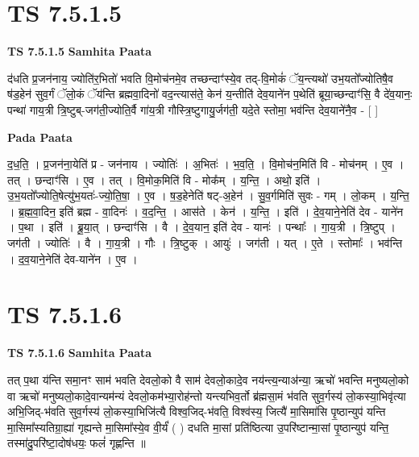 \documentclass[17pt]{extarticle}
\begin{document}
\section*{ TS 7.5.1.5 }

\textbf{TS 7.5.1.5 } \newline
\textbf{Samhita Paata} \newline

द॑धति प्र॒जन॑नाय॒ ज्योति॑र॒भितो॑ भवति वि॒मोच॑नमे॒व तच्छन्दाꣳ॑स्ये॒व तद्-वि॒मोकं॑ ॅय॒न्त्यथो॑ उभ॒यतो᳚ज्योतिषै॒व ष॑ड॒हेन॑ सुव॒र्गं ॅलो॒कं ॅय॑न्ति ब्रह्मवा॒दिनो॑ वद॒न्त्यास॑ते॒ केन॑ य॒न्तीति॑ देव॒याने॑न प॒थेति॑ ब्रूया॒च्छन्दाꣳ॑सि॒ वै दे॑व॒यानः॒ पन्था॑ गाय॒त्री त्रि॒ष्टुब्-जग॑ती॒ज्योति॒र्वै गा॑य॒त्री गौस्त्रि॒ष्टुगायु॒र्जग॑ती॒ यदे॒ते स्तोमा॒ भव॑न्ति देव॒याने॑नै॒व - [  ] \newline

\textbf{Pada Paata} \newline

द॒ध॒ति॒ । प्र॒जन॑ना॒येति॑ प्र - जन॑नाय । ज्योतिः॑ । अ॒भितः॑ । भ॒व॒ति॒ । वि॒मोच॑न॒मिति॑ वि - मोच॑नम् । ए॒व । तत् । छन्दाꣳ॑सि । ए॒व । तत् । वि॒मोक॒मिति॑ वि - मोक᳚म् । य॒न्ति॒ । अथो॒ इति॑ । उ॒भ॒यतो᳚ज्योति॒षेत्यु॑भ॒यतः॑-ज्यो॒ति॒षा॒ । ए॒व । ष॒ड॒हेनेति॑ षट्-अ॒हेन॑ । सु॒व॒र्गमिति॑ सुवः - गम् । लो॒कम् । य॒न्ति॒ । ब्र॒ह्म॒वा॒दिन॒ इति॑ ब्रह्म - वा॒दिनः॑ । व॒द॒न्ति॒ । आस॑ते । केन॑ । य॒न्ति॒ । इति॑ । दे॒व॒याने॒नेति॑ देव - याने॑न । प॒था । इति॑ । ब्रू॒या॒त् । छन्दाꣳ॑सि । वै । दे॒व॒यान॒ इति॑ देव - यानः॑ । पन्थाः᳚ । गा॒य॒त्री । त्रि॒ष्टुप् । जग॑ती । ज्योतिः॑ । वै । गा॒य॒त्री । गौः । त्रि॒ष्टुक् । आयुः॑ । जग॑ती । यत् । ए॒ते । स्तोमाः᳚ । भव॑न्ति । द॒व॒याने॒नेति॑ देव-याने॑न । ए॒व ।  \newline




\section*{ TS 7.5.1.6 }

\textbf{TS 7.5.1.6 } \newline
\textbf{Samhita Paata} \newline

तत् प॒था य॑न्ति समा॒नꣳ साम॑ भवति देवलो॒को वै साम॑ देवलो॒कादे॒व नय॑न्त्य॒न्याअ॑न्या॒ ऋचो॑ भवन्ति मनुष्यलो॒को वा ऋचो॑ मनुष्यलो॒कादे॒वान्यम॑न्यं देवलो॒कम॑भ्या॒रोह॑न्तो यन्त्यभिव॒र्तो ब्र॑ह्मसा॒मं भ॑वति सुव॒र्गस्य॑ लो॒कस्या॒भिवृ॑त्या अभि॒जिद्-भ॑वति सुव॒र्गस्य॑ लो॒कस्या॒भिजि॑त्यै विश्व॒जिद्-भ॑वति॒ विश्व॑स्य॒ जित्यै॑ मा॒सिमा॑सि पृ॒ष्ठान्युप॑ यन्ति मा॒सिमा᳚स्यतिग्रा॒ह्या॑ गृह्यन्ते मा॒सिमा᳚स्ये॒व वी॒र्यं॑ ( ) दधति मा॒सां प्रति॑ष्ठित्या उ॒परि॑ष्टान्मा॒सां पृ॒ष्ठान्युप॑ यन्ति॒ तस्मा॑दु॒परि॑ष्टा॒दोष॑धयः॒ फलं॑ गृह्णन्ति ॥ \newline
\end{document}
